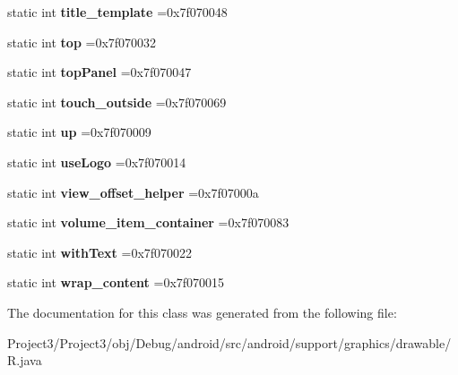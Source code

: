 \begin{DoxyCompactItemize}
static int {\bfseries title\+\_\+template} =0x7f070048
\item 
\mbox{\label{classandroid_1_1support_1_1graphics_1_1drawable_1_1R_1_1id_acb7c318d18e373329ffd7bbe851110b6}} 
static int {\bfseries top} =0x7f070032
\item 
\mbox{\label{classandroid_1_1support_1_1graphics_1_1drawable_1_1R_1_1id_a4fbb7d416d0cf56af637ed4619f3ba3e}} 
static int {\bfseries top\+Panel} =0x7f070047
\item 
\mbox{\label{classandroid_1_1support_1_1graphics_1_1drawable_1_1R_1_1id_a11f9faf1d1f5394d23546d5ac95c82c1}} 
static int {\bfseries touch\+\_\+outside} =0x7f070069
\item 
\mbox{\label{classandroid_1_1support_1_1graphics_1_1drawable_1_1R_1_1id_aec9c3021246e8c5df7ada8a908bbc4d3}} 
static int {\bfseries up} =0x7f070009
\item 
\mbox{\label{classandroid_1_1support_1_1graphics_1_1drawable_1_1R_1_1id_a410bb59e9d2d0af4f52b5e2322526e54}} 
static int {\bfseries use\+Logo} =0x7f070014
\item 
\mbox{\label{classandroid_1_1support_1_1graphics_1_1drawable_1_1R_1_1id_a626d206834590fa8eed810f84b3adecb}} 
static int {\bfseries view\+\_\+offset\+\_\+helper} =0x7f07000a
\item 
\mbox{\label{classandroid_1_1support_1_1graphics_1_1drawable_1_1R_1_1id_a3b6bee7ebd23078a1de3a6845b2f25cc}} 
static int {\bfseries volume\+\_\+item\+\_\+container} =0x7f070083
\item 
\mbox{\label{classandroid_1_1support_1_1graphics_1_1drawable_1_1R_1_1id_a7a64957862ab2ffec7bf270545819174}} 
static int {\bfseries with\+Text} =0x7f070022
\item 
\mbox{\label{classandroid_1_1support_1_1graphics_1_1drawable_1_1R_1_1id_a459b3fc353a25d45e73e349dd3871798}} 
static int {\bfseries wrap\+\_\+content} =0x7f070015
\end{DoxyCompactItemize}


The documentation for this class was generated from the following file\+:\begin{DoxyCompactItemize}
\item 
Project3/\+Project3/obj/\+Debug/android/src/android/support/graphics/drawable/R.\+java\end{DoxyCompactItemize}
